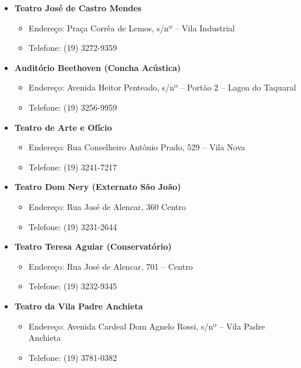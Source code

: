 \begin{itemize}
\item  \textbf{Teatro José de Castro Mendes}
    \begin{itemize}
        \item  Endereço: Praça Corrêa de Lemos, s/nº -- Vila Industrial
        \item  Telefone: (19) 3272-9359
    \end{itemize}

\item  \textbf{Auditório Beethoven (Concha Acústica)}
    \begin{itemize}
        \item  Endereço: Avenida Heitor Penteado, s/nº -- Portão 2 -- Lagoa do Taquaral
        \item  Telefone: (19) 3256-9959
    \end{itemize}

\item  \textbf{Teatro de Arte e Ofício}
    \begin{itemize}
        \item  Endereço: Rua Conselheiro Antônio Prado, 529 -- Vila Nova
        \item  Telefone: (19) 3241-7217
    \end{itemize}

\item  \textbf{Teatro Dom Nery (Externato São João)}
    \begin{itemize}
        \item  Endereço: Rua José de Alencar, 360  Centro
        \item  Telefone: (19) 3231-2644
    \end{itemize}

\item  \textbf{Teatro Teresa Aguiar (Conservatório)}
    \begin{itemize}
        \item  Endereço: Rua José de Alencar, 701 -- Centro
        \item  Telefone: (19) 3232-9345
    \end{itemize}

\item  \textbf{Teatro da Vila Padre Anchieta}
    \begin{itemize}
        \item  Endereço: Avenida Cardeal Dom Agnelo Rossi, s/nº -- Vila Padre Anchieta
        \item  Telefone: (19) 3781-0382
    \end{itemize}


\end{itemize}
